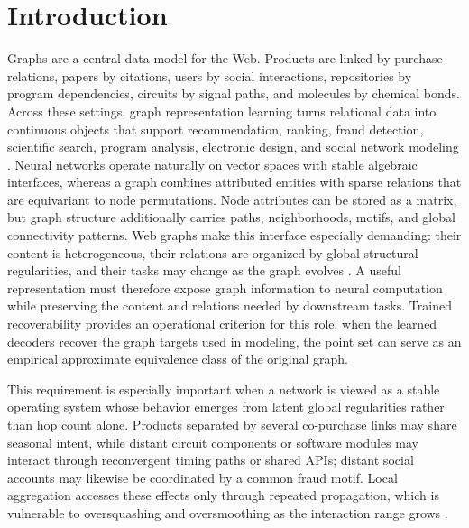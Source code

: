 \section{Introduction}
\label{sec:intro}

Graphs are a central data model for the Web.  Products are linked by purchase
relations, papers by citations, users by social interactions, repositories by
program dependencies, circuits by signal paths, and molecules by chemical bonds.
Across these settings, graph representation learning turns relational data into
continuous objects that support recommendation, ranking, fraud detection,
scientific search, program analysis, electronic design, and social network
modeling \cite{hamilton2017,kipf2017,sen2008,yang2016,dong2023cktgnn,
guo2022timing}.  Neural networks operate naturally on vector spaces with stable
algebraic interfaces, whereas a graph combines attributed entities with sparse
relations that are equivariant to node permutations.  Node attributes can be
stored as a matrix, but graph structure additionally carries paths,
neighborhoods, motifs, and global connectivity patterns.  Web graphs make this
interface especially demanding: their content is heterogeneous, their relations
are organized by global structural regularities, and their tasks may change as
the graph evolves \cite{sen2008,yang2016,shchur2018}.  A useful representation
must therefore expose graph information to neural computation while preserving
the content and relations needed by downstream tasks.  Trained recoverability
provides an operational criterion for this role: when the learned decoders
recover the graph targets used in modeling, the point set can serve as an
empirical approximate equivalence class of the original graph.

This requirement is especially important when a network is viewed as a stable
operating system whose behavior emerges from latent global regularities rather
than hop count alone.  Products separated by several co-purchase links may
share seasonal intent, while distant circuit components or software modules may
interact through reconvergent timing paths or shared APIs; distant social
accounts may likewise be coordinated by a common fraud motif.  Local aggregation
accesses these effects only through repeated propagation, which is vulnerable to
oversquashing and oversmoothing as the interaction range grows
\cite{alon2021bottleneck,topping2022oversquashing,dong2023cktgnn,guo2022timing,
wang2024graphmamba}.


